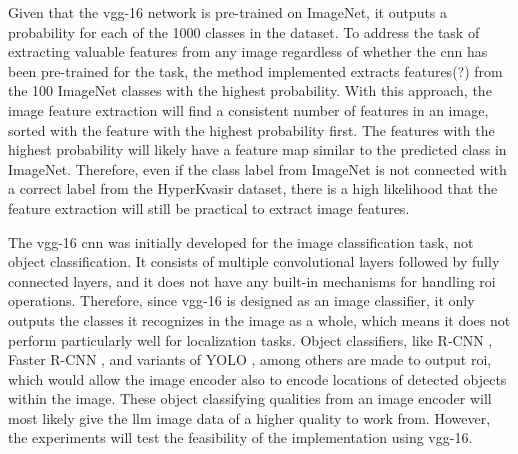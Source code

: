         Given that the \gls{vgg}-16 network is pre-trained on ImageNet, it outputs a probability for each of the 1000 classes in the dataset. To address the task of extracting valuable features from any image regardless of whether the \gls{cnn} has been pre-trained for the task, the method implemented extracts features(?) from the 100 ImageNet classes with the highest probability. With this approach, the image feature extraction will find a consistent number of features in an image, sorted with the feature with the highest probability first. The features with the highest probability will likely have a feature map similar to the predicted class in ImageNet. Therefore, even if the class label from ImageNet is not connected with a correct label from the HyperKvasir dataset, there is a high likelihood that the feature extraction will still be practical to extract image features.

        The \gls{vgg}-16 \gls{cnn} was initially developed for the image classification task, not object classification. It consists of multiple convolutional layers followed by fully connected layers, and it does not have any built-in mechanisms for handling \gls{roi} operations. 
        Therefore, since \gls{vgg}-16 is designed as an image classifier, it only outputs the classes it recognizes in the image as a whole, which means it does not perform particularly well for localization tasks. Object classifiers, like R-CNN \cite{girshickRichFeatureHierarchies2014}, Faster R-CNN \cite{renFasterRCNNRealTime2015}, and variants of YOLO \cite{redmonYouOnlyLook2016, redmonYOLO9000BetterFaster2016, redmonYOLOv3IncrementalImprovement2018, bochkovskiyYOLOv4OptimalSpeed2020, jocherYolov5, liYOLOv6SingleStageObject2022, wangYOLOv7TrainableBagoffreebies2022, jocherYOLOUltralytics2023}, among others are made to output \gls{roi}, which would allow the image encoder also to encode locations of detected objects within the image. These object classifying qualities from an image encoder will most likely give the \gls{llm} image data of a higher quality to work from. However, the experiments will test the feasibility of the implementation using \gls{vgg}-16.


        
